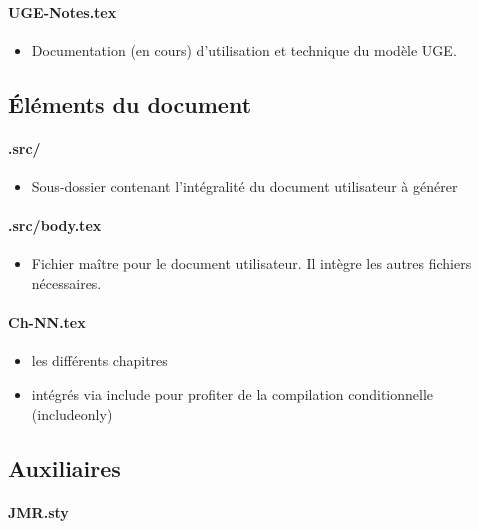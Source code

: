 \paragraph{UGE-Notes.tex}
\begin{itemize}
\item Documentation (en cours) d'utilisation et technique du modèle UGE.
\end{itemize}

\subsection{Éléments du document}

\paragraph{.src/}

\begin{itemize}
\item Sous-dossier contenant l'intégralité du document utilisateur à générer
\end{itemize}

\paragraph{.src/body.tex}

\begin{itemize}
\item Fichier maître pour le document utilisateur. Il intègre les autres fichiers nécessaires.
\end{itemize}

\paragraph{Ch-NN.tex}

\begin{itemize}
\item les différents chapitres
\item intégrés via include pour profiter de la compilation conditionnelle (includeonly)
\end{itemize}

\subsection{Auxiliaires}

\paragraph{JMR.sty}

